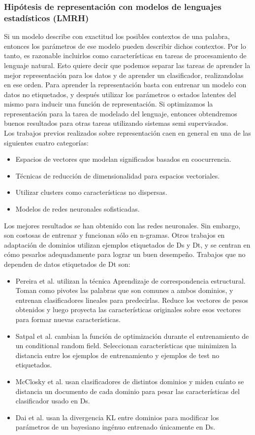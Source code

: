 \documentclass[11pt,spanish]{article}
\begin{document}
\subsubsection{Hipótesis de representación con modelos de lenguajes estadísticos (LMRH)}
Si un modelo describe con exactitud los posibles contextos de una palabra, entonces los parámetros de ese modelo pueden describir dichos contextos. Por lo tanto, es razonable incluirlos como características en tareas de procesamiento de lenguaje natural.
Esto quiere decir que podemos separar las tareas de aprender la mejor representación para los datos y de aprender un clasificador, realizandolas en ese orden. Para aprender la representación basta con entrenar un modelo con datos no etiquetados, y después utilizar los parámetros o estados latentes del mismo para inducir una función de representación. Si optimizamos la representación para la tarea de modelado del lenguaje, entonces obtendremos buenos resultados para otras tareas utilizando sistemas semi supervisados. 
\\
Los trabajos previos realizados sobre representación caen en general en una de las siguientes cuatro categorías:
\begin{itemize}
    \item Espacios de vectores que modelan significados basados en coocurrencia.
    \item Técnicas de reducción de dimensionalidad para espacios vectoriales.
    \item Utilizar clusters como características no dispersas.
    \item Modelos de redes neuronales sofisticadas.
\end{itemize}
Los mejores resultados se han obtenido con las redes neuronales. Sin embargo, son costosas de entrenar y funcionan sólo en n-gramas.
Otros trabajos en adaptación de dominios utilizan ejemplos etiquetados de Ds y Dt, y se centran en cómo pesarlos adequadamente para lograr un buen desempeño. Trabajos que no dependen de datos etiquetados de Dt son:
\begin{itemize}
    \item Pereira et al. utilizan la técnica Aprendizaje de correspondencia estructural. Toman como pivotes las palabras que son comunes a ambos dominios, y entrenan clasificadores lineales para predecirlas. Reduce los vectores de pesos obtenidos y luego proyecta las características originales sobre esos vectores para formar nuevas características.
    \item Satpal et al. cambian la función de optimización durante el entrenamiento de un conditional random field. Seleccionan características que minimizen la distancia entre los ejemplos de entrenamiento y ejemplos de test no etiquetados.
    \item McClosky et al. usan clasificadores de distintos dominios y miden cuánto se distancia un documento de cada dominio para pesar las características del clasificador usado en Ds.
    \item Dai et al. usan la divergencia KL entre dominios para modificar los parámetros de un bayesiano ingénuo entrenado únicamente en Ds.
\end{itemize}
\end{document}
